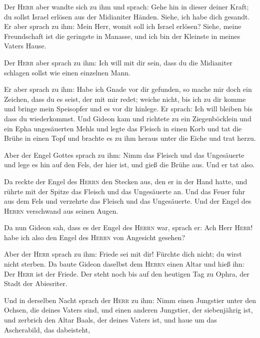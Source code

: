  Der \textsc{Herr} aber wandte sich zu ihm und sprach:
Gehe hin in dieser deiner Kraft; du sollst Israel erlösen aus der
Midianiter Händen. Siehe, ich habe dich gesandt.  Er aber
sprach zu ihm: Mein Herr, womit soll ich Israel erlösen? Siehe, meine
Freundschaft ist die geringste in Manasse, und ich bin der Kleinste in
meines Vaters Hause.

 Der \textsc{Herr} aber sprach zu ihm: Ich will mit dir
sein, dass du die Midianiter schlagen sollst wie einen einzelnen Mann.

 Er aber sprach zu ihm: Habe ich Gnade vor dir gefunden,
so mache mir doch ein Zeichen, dass du es seist, der mit mir redet;
 weiche nicht, bis ich zu dir komme und bringe mein
Speisopfer und es vor dir hinlege. Er sprach: Ich will bleiben bis dass
du wiederkommst.  Und Gideon kam und richtete zu ein
Ziegenböcklein und ein Epha ungesäuerten Mehls und legte das Fleisch in
einen Korb und tat die Brühe in einen Topf und brachte es zu ihm heraus
unter die Eiche und trat herzu.

 Aber der Engel Gottes sprach zu ihm: Nimm das Fleisch
und das Ungesäuerte und lege es hin auf den Fels, der hier ist, und gieß
die Brühe aus. Und er tat also.

 Da reckte der Engel des \textsc{Herrn} den Stecken aus,
den er in der Hand hatte, und rührte mit der Spitze das Fleisch und das
Ungesäuerte an. Und das Feuer fuhr aus dem Fels und verzehrte das
Fleisch und das Ungesäuerte. Und der Engel des \textsc{Herrn} verschwand
aus seinen Augen.

 Da nun Gideon sah, dass es der Engel des \textsc{Herrn}
war, sprach er: Ach Herr \textsc{Herr}! habe ich also den Engel des
\textsc{Herrn} von Angesicht gesehen?

 Aber der \textsc{Herr} sprach zu ihm: Friede sei mit
dir! Fürchte dich nicht; du wirst nicht sterben.  Da
baute Gideon daselbst dem \textsc{Herrn} einen Altar und hieß ihn: Der
\textsc{Herr} ist der Friede. Der steht noch bis auf den heutigen Tag zu
Ophra, der Stadt der Abiesriter.

 Und in derselben Nacht sprach der \textsc{Herr} zu ihm:
Nimm einen Jungstier unter den Ochsen, die deines Vaters sind, und einen
anderen Jungstier, der siebenjährig ist, und zerbrich den Altar Baals,
der deines Vaters ist, und haue um das Ascherabild, das dabeisteht,

